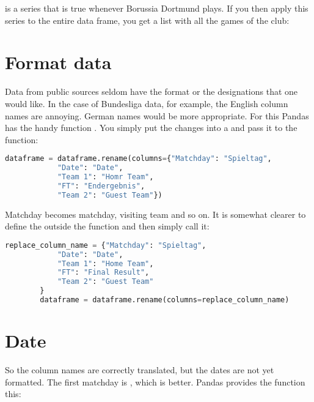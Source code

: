 
 is a series that is true whenever Borussia Dortmund plays. If you then apply this series to the entire data frame, you get a list with all the games of the club:


\section{Format data}

Data from public sources seldom have the format or the designations that one would like. In the case of Bundesliga data, for example, the English column names are annoying. German names would be more appropriate.
For this Pandas has the handy function . You simply put the changes into a  and pass it to the function:

\medskip

{\footnotesize
	\begin{lstlisting}[language=Python]
		dataframe = dataframe.rename(columns={"Matchday": "Spieltag",
			"Date": "Date",
			"Team 1": "Homr Team",
			"FT": "Endergebnis",
			"Team 2": "Guest Team"})
	\end{lstlisting}
}

\medskip






Matchday becomes matchday,  visiting team and so on. It is somewhat clearer to define the  outside the function and then simply call it:

\medskip

{\footnotesize
	\begin{lstlisting}[language=Python]
		replace_column_name = {"Matchday": "Spieltag",
			"Date": "Date",
			"Team 1": "Home Team",
			"FT": "Final Result",
			"Team 2": "Guest Team"
		}
		dataframe = dataframe.rename(columns=replace_column_name)
	\end{lstlisting}
}
\medskip



\section{Date}

So the column names are correctly translated, but the dates are not yet formatted. The first matchday is , which is better. Pandas provides the function  this:


